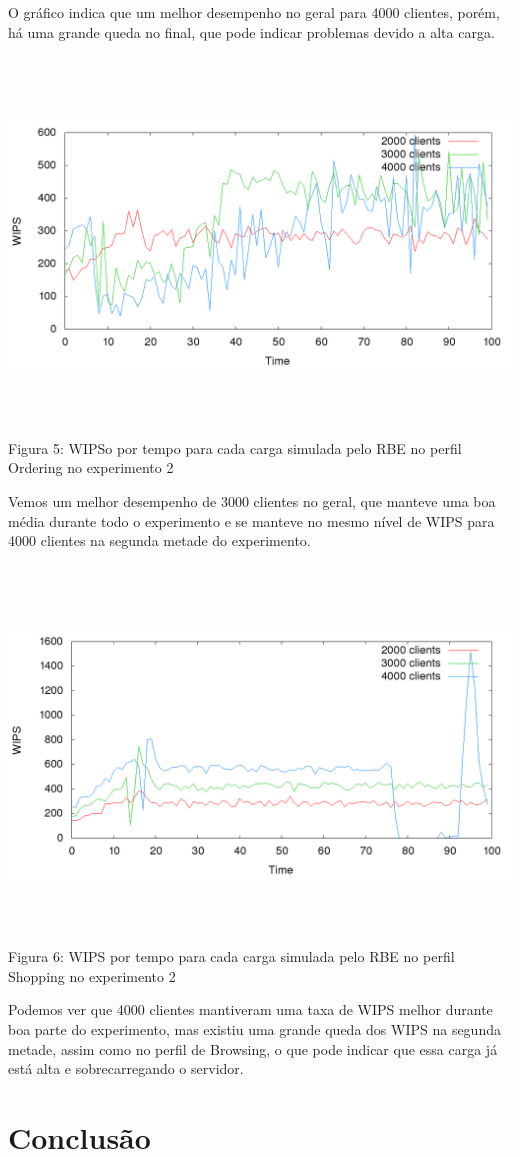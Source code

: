 \documentclass[11pt,twoside]{article}
\begin{document}
O gráfico indica que um melhor desempenho no geral para 4000 clientes, porém, há uma grande queda no final, que pode indicar problemas devido a alta carga.

\begin{center}
\includegraphics[width=15cm, height=10cm]{images/exp2/plot_ordering}
Figura 5: WIPSo por tempo para cada carga simulada pelo RBE no perfil Ordering no experimento 2
\end{center}

Vemos um melhor desempenho de 3000 clientes no geral, que manteve uma boa média durante todo o experimento e se manteve no mesmo nível de WIPS para 4000 clientes na segunda metade do experimento.

\begin{center}
\includegraphics[width=15cm, height=10cm]{images/exp2/plot_shopping}
Figura 6: WIPS por tempo para cada carga simulada pelo RBE no perfil Shopping no experimento 2
\end{center}

Podemos ver que 4000 clientes mantiveram uma taxa de WIPS melhor durante boa parte do experimento, mas existiu uma grande queda dos WIPS na segunda metade, assim como no perfil de Browsing, o que pode indicar que essa carga já está alta e sobrecarregando o servidor.

\section{Conclus\~ao}
\end{document}
